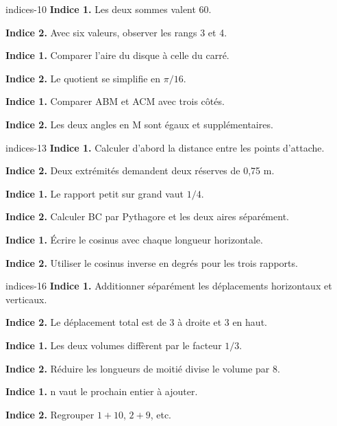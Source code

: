 \begin{blocEdition}{indices-10}
\textbf{Indice 1.} Les deux sommes valent 60.\par\medskip\textbf{Indice 2.} Avec six valeurs, observer les rangs 3 et 4.\par
{}\textbf{Indice 1.} Comparer l’aire du disque à celle du carré.\par\medskip\textbf{Indice 2.} Le quotient se simplifie en $\pi/16$.\par
{}\textbf{Indice 1.} Comparer ABM et ACM avec trois côtés.\par\medskip\textbf{Indice 2.} Les deux angles en M sont égaux et supplémentaires.\par

\end{blocEdition}
\begin{blocEdition}{indices-13}
\textbf{Indice 1.} Calculer d’abord la distance entre les points d’attache.\par\medskip\textbf{Indice 2.} Deux extrémités demandent deux réserves de 0,75 m.\par
{}\textbf{Indice 1.} Le rapport petit sur grand vaut $1/4$.\par\medskip\textbf{Indice 2.} Calculer BC par Pythagore et les deux aires séparément.\par
{}\textbf{Indice 1.} Écrire le cosinus avec chaque longueur horizontale.\par\medskip\textbf{Indice 2.} Utiliser le cosinus inverse en degrés pour les trois rapports.\par

\end{blocEdition}
\begin{blocEdition}{indices-16}
\textbf{Indice 1.} Additionner séparément les déplacements horizontaux et verticaux.\par\medskip\textbf{Indice 2.} Le déplacement total est de 3 à droite et 3 en haut.\par
{}\textbf{Indice 1.} Les deux volumes diffèrent par le facteur $1/3$.\par\medskip\textbf{Indice 2.} Réduire les longueurs de moitié divise le volume par 8.\par
{}\textbf{Indice 1.} n vaut le prochain entier à ajouter.\par\medskip\textbf{Indice 2.} Regrouper $1+10$, $2+9$, etc.\par

\end{blocEdition}
